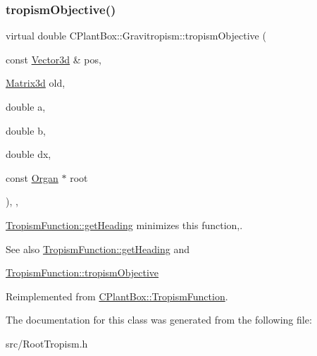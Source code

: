 \subsubsection{\texorpdfstring{tropism\+Objective()}{tropismObjective()}}
{\footnotesize\ttfamily virtual double C\+Plant\+Box\+::\+Gravitropism\+::tropism\+Objective (\begin{DoxyParamCaption}\item[{const \hyperlink{classCPlantBox_1_1Vector3d}{Vector3d} \&}]{pos,  }\item[{\hyperlink{classCPlantBox_1_1Matrix3d}{Matrix3d}}]{old,  }\item[{double}]{a,  }\item[{double}]{b,  }\item[{double}]{dx,  }\item[{const \hyperlink{classCPlantBox_1_1Organ}{Organ} $\ast$}]{root }\end{DoxyParamCaption})\hspace{0.3cm}{\ttfamily [inline]}, {\ttfamily [override]}, {\ttfamily [virtual]}}



\hyperlink{classCPlantBox_1_1TropismFunction_adb52b88734a94fe1365a00e02c7e6be5}{Tropism\+Function\+::get\+Heading} minimizes this function,. 

\begin{DoxySeeAlso}{See also}
\hyperlink{classCPlantBox_1_1TropismFunction_adb52b88734a94fe1365a00e02c7e6be5}{Tropism\+Function\+::get\+Heading} and 

\hyperlink{classCPlantBox_1_1TropismFunction_a4f2c79fff55d1398c98a070dd8ebbe08}{Tropism\+Function\+::tropism\+Objective} 
\end{DoxySeeAlso}


Reimplemented from \hyperlink{classCPlantBox_1_1TropismFunction_a4f2c79fff55d1398c98a070dd8ebbe08}{C\+Plant\+Box\+::\+Tropism\+Function}.



The documentation for this class was generated from the following file\+:\begin{DoxyCompactItemize}
\item 
src/Root\+Tropism.\+h\end{DoxyCompactItemize}
